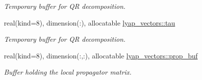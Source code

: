 \begin{DoxyCompactItemize}
\begin{DoxyCompactList}\small\item\em Temporary buffer for QR decomposition. \end{DoxyCompactList}\item 
real(kind=8), dimension(\+:), allocatable \hyperlink{namespacelyap__vectors_a336c0490ac0927589648b33fe7abc733}{lyap\+\_\+vectors\+::tau}
\begin{DoxyCompactList}\small\item\em Temporary buffer for QR decomposition. \end{DoxyCompactList}\item 
real(kind=8), dimension(\+:,\+:), allocatable \hyperlink{namespacelyap__vectors_ac3665710ab2b402b9e952fa3311d2517}{lyap\+\_\+vectors\+::prop\+\_\+buf}
\begin{DoxyCompactList}\small\item\em Buffer holding the local propagator matrix. \end{DoxyCompactList}\end{DoxyCompactItemize}
